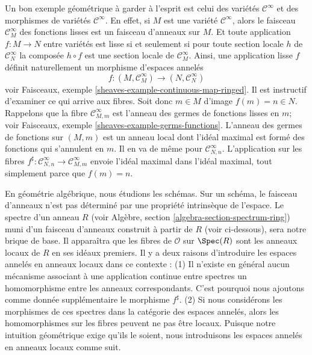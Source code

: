 \medskip\noindent
Un bon exemple géométrique à garder à l'esprit est celui des
variétés $\mathcal{C}^\infty$ et des morphismes de
variétés $\mathcal{C}^\infty$. En effet, si $M$ est une
variété $\mathcal{C}^\infty$, alors le faisceau $\mathcal{C}^\infty_M$
des fonctions lisses est un faisceau d'anneaux sur $M$. Et toute
application $f : M \to N$ entre variétés est lisse si et seulement si
pour toute section locale $h$ de $\mathcal{C}^\infty_N$
la composée $h \circ f$ est une section locale de $\mathcal{C}^\infty_M$.
Ainsi, une application lisse $f$ définit naturellement un morphisme
d'espaces annelés
$$
f : (M , \mathcal{C}^\infty_M) \longrightarrow (N, \mathcal{C}^\infty_N)
$$
voir Faisceaux, exemple \ref{sheaves-example-continuous-map-ringed}.
Il est instructif d'examiner ce qui arrive aux fibres. Soit donc
$m \in M$ d'image $f(m) = n \in N$. Rappelons que la fibre
$\mathcal{C}^\infty_{M, m}$ est l'anneau des germes de fonctions lisses
en $m$; voir
Faisceaux, exemple \ref{sheaves-example-germs-functions}.
L'anneau des germes de fonctions sur $(M, m)$ est un anneau local dont l'idéal
maximal est formé des fonctions qui s'annulent en $m$.
Il en va de même pour $\mathcal{C}^\infty_{N, n}$. L'application sur les fibres
$f^\sharp : \mathcal{C}^\infty_{N, n} \to \mathcal{C}^\infty_{M, m}$
envoie l'idéal maximal dans l'idéal maximal, tout simplement
parce que $f(m) = n$.

\medskip\noindent
En géométrie algébrique, nous étudions les schémas. Sur un schéma, le faisceau d'anneaux
n'est pas déterminé par une propriété intrinsèque de l'espace.
Le spectre d'un anneau $R$
(voir Algèbre, section \ref{algebra-section-spectrum-ring}) muni
d'un faisceau d'anneaux construit à partir de $R$ (voir ci-dessous),
sera notre brique de base. Il apparaîtra que
les fibres de $\mathcal{O}$ sur $\Spec(R)$ sont les anneaux locaux
de $R$ en ses idéaux premiers. Il y a deux raisons d'introduire
les espaces annelés en anneaux locaux dans ce contexte : (1) Il n'existe en général
aucun mécanisme associant à une application continue entre spectres un
homomorphisme entre les anneaux correspondants. C'est pourquoi nous ajoutons comme donnée
supplémentaire le morphisme $f^\sharp$. (2) Si nous considérons les morphismes
de ces spectres dans la catégorie des espaces annelés, alors les
homomorphismes sur les fibres peuvent ne pas être locaux. Puisque notre
intuition géométrique exige qu'ils le soient, nous introduisons les espaces annelés en anneaux locaux
comme suit.

